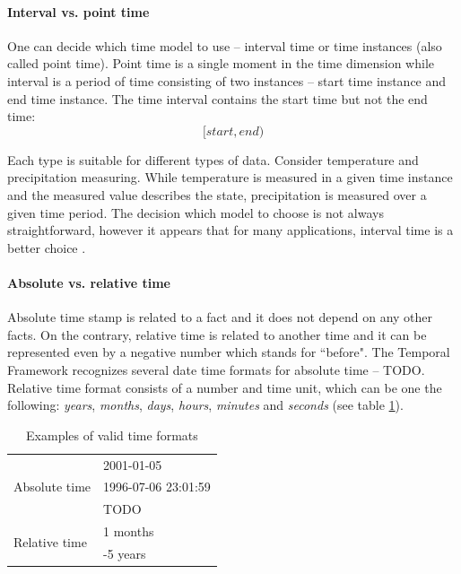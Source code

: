 \documentclass[a4paper,12pt,oneside]{book}
\newcommand{\tf}{Temporal Framework\xspace}
\begin{document}
\paragraph{Interval vs. point time}
\label{sec:intervalVsPoint}
One can decide which time model to use -- interval time or time instances (also called point time).
Point time is a single moment in the time dimension
while interval is a period of time consisting of two instances -- start time instance and end time instance.
The time interval contains the start time but not the end time:
$$[start, end)$$

Each type is suitable for different types of data.
Consider temperature and precipitation measuring.
While temperature is measured in a given time instance and the measured value describes the state,
precipitation is measured over a given time period. The decision which model to choose is not always
straightforward, however it appears that for many applications,
interval time is a better choice \cite{pointVsInterval}.

\paragraph{Absolute vs. relative time}
\label{sec:absoluteVsRelative}
Absolute time stamp is related to a fact and it does not depend on any other facts.
On the contrary, relative time is related to another time and
it can be represented even by a negative number which stands for ``before".
The \tf recognizes several date time formats for absolute time -- TODO.
Relative time format consists of a number and time unit, which can be one the following: \emph{years},
\emph{months}, \emph{days}, \emph{hours}, \emph{minutes} and \emph{seconds} (see table \ref{tab:timeFormat}).

\begin{table}[ht!]
  \centering
\caption{Examples of valid time formats}
\label{tab:timeFormat}
\setlength{\extrarowheight}{3pt}
\begin{tabular}{|l|l|}
\hline
\multirow{3}{*}{Absolute time}
 & 2001-01-05  \\ \cline{2-2}
 & 1996-07-06 23:01:59  \\\cline{2-2}
 & TODO  \\
 \hline
\multirow{2}{*}{Relative time}
 & 1 months  \\\cline{2-2}
 & -5 years  \\
 \hline
\end{tabular}
\end{table}
\end{document}
